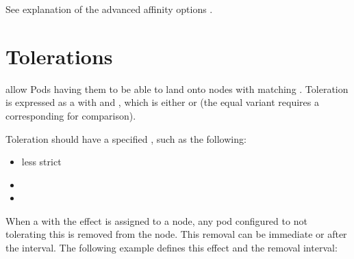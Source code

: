 \documentclass[letterpaper,10pt,english]{sphinxmanual}
\begin{document}
See explanation of the advanced affinity options .


\section{Tolerations}
\label{\detokenize{constraints:tolerations}}
 allow Pods having them to be able to land onto nodes with
matching . Toleration is expressed as a  with and
, which is either  or  (the equal
variant requires a corresponding  for comparison).

Toleration should have a specified , such as the following:
\begin{itemize}
\item {} 
 \sphinxhyphen{}  less strict

\item {} 

\item {} 

\end{itemize}

When a  with the  effect is assigned to a node, any pod configured to not tolerating this  is removed from the node. This removal can be immediate or after the  interval. The following example defines this effect and the removal interval:

\begin{sphinxVerbatim}[commandchars=\\\{\}]
  
   
   
   
\end{sphinxVerbatim}
\end{document}
